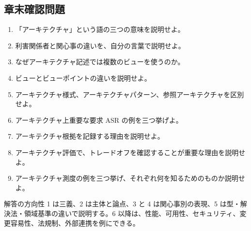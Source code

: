 \subsection{章末確認問題}
\begin{enumerate}
  \item 「アーキテクチャ」という語の三つの意味を説明せよ。
  \item 利害関係者と関心事の違いを、自分の言葉で説明せよ。
  \item なぜアーキテクチャ記述では複数のビューを使うのか。
  \item ビューとビューポイントの違いを説明せよ。
  \item アーキテクチャ様式、アーキテクチャパターン、参照アーキテクチャを区別せよ。
  \item アーキテクチャ上重要な要求 ASR の例を三つ挙げよ。
  \item アーキテクチャ根拠を記録する理由を説明せよ。
  \item アーキテクチャ評価で、トレードオフを確認することが重要な理由を説明せよ。
  \item アーキテクチャ測度の例を三つ挙げ、それぞれ何を知るためのものか説明せよ。
\end{enumerate}

\begin{statementbox}{解答の方向性}
1 は三義、2 は主体と論点、3 と 4 は関心事別の表現、5 は型・解決法・領域基準の違いで説明する。6 以降は、性能、可用性、セキュリティ、変更容易性、法規制、外部連携を例にできる。
\end{statementbox}
